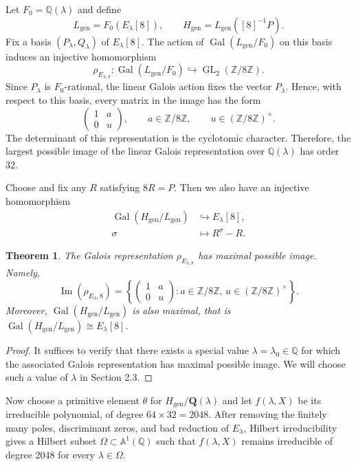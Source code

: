 \documentclass[11pt,a4paper]{amsart}
\newtheorem{theorem}{Theorem}[section]
\theoremstyle{definition}
\newcommand{\Q}{\mathbf Q}
\numberwithin{equation}{section}
\begin{document}
Let $F_0=\mathbb{Q}(\lambda)$ and define
\[
L_{\mathrm{gen}}=F_0(E_\lambda[8]),
\qquad
H_{\mathrm{gen}}=L_{\mathrm{gen}}([8]^{-1}P).
\]
Fix a basis $(P_\lambda,Q_\lambda)$ of $E_\lambda[8]$. The action of
$\operatorname{Gal}(L_{\mathrm{gen}}/F_0)$ on this basis induces an injective
homomorphism
\begin{equation*}
 	\rho_{E_{\lambda, 8}} :\operatorname{Gal}(L_{\mathrm{gen}}/F_0)
	\hookrightarrow
	\operatorname{GL}_2(\mathbb{Z}/8\mathbb{Z}).
\end{equation*}
Since $P_\lambda$ is $F_0$-rational, the linear Galois action fixes the vector $P_\lambda$.
Hence, with respect to this basis, every matrix in the image has the form
\[
\begin{pmatrix}
	1&a\\
	0&u
\end{pmatrix},
\qquad
a\in\mathbb{Z}/8\mathbb{Z},
\qquad
u\in(\mathbb{Z}/8\mathbb{Z})^\times .
\]
The determinant of this representation is the cyclotomic character.
Therefore, the largest possible image of the linear Galois representation
over $\mathbb{Q}(\lambda)$ has order 32.

Choose and fix any $R$ satisfying $8R=P$. Then we also have an injective
homomorphism
\begin{align*}
	\operatorname{Gal}(H_{\mathrm{gen}}/L_{\mathrm{gen}})
	&\hookrightarrow E_\lambda[8],\\
	\sigma&\longmapsto R^\sigma-R .
\end{align*}
\begin{theorem}
	The Galois representation $\rho_{E_{\lambda, 8}}$ has maximal possible image. Namely,
	\[
	\operatorname{Im}(\rho_{E_\lambda,8})
	=
	\left\{
	\begin{pmatrix}
		1&a\\
		0&u
	\end{pmatrix}
	:
	a\in\mathbb Z/8\mathbb Z,\,
	u\in(\mathbb Z/8\mathbb Z)^\times
	\right\}.
	\]
	Moreover,  $\operatorname{Gal}(H_{\mathrm{gen}}/L_{\mathrm{gen}})$ is also maximal, that is
$
	\operatorname{Gal}(H_{\mathrm{gen}}/L_{\mathrm{gen}})
	\cong E_\lambda[8].
$
\end{theorem}
\begin{proof}
	It suffices to verify that there exists a special value
	$\lambda=\lambda_0\in\mathbb{Q}$ for which the associated Galois
	representation has maximal possible image. We will choose such a value of
	$\lambda$ in  Section 2.3.
\end{proof}

Now choose a 
primitive element $\theta$ for $H_{\mathrm{gen}}/\Q(\lambda)$ and let
$f(\lambda,X)$ be its irreducible polynomial, of degree $64\times 32=2048$.  After
removing the finitely many poles, discriminant zeros, and bad reduction of $E_\lambda$, Hilbert irreducibility
\cite[Chapter 3, Proposition 3.3.5]{SerreTG}
gives a Hilbert subset
$
\Omega\subset \mathbb{A}^1(\mathbb{Q})
$
such that $f(\lambda,X)$ remains irreducible of degree $2048$ for every
$\lambda\in\Omega$.  
\end{document}
